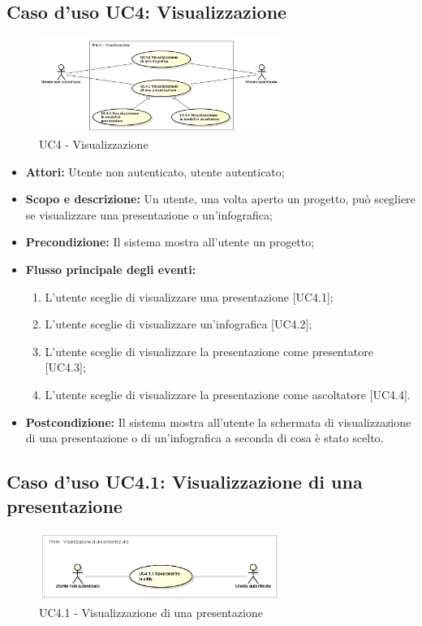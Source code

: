 \subsection{Caso d'uso UC4: Visualizzazione}
\begin{figure}[h] 
	\centering 
	\includegraphics[width=0.7\textwidth] {img/UC4.png}
	\caption{UC4 - Visualizzazione} 
\end{figure}

\begin{itemize}
	\item \textbf{Attori:} Utente non autenticato, utente autenticato;
	\item \textbf{Scopo e descrizione:} Un utente, una volta aperto un progetto, può scegliere se visualizzare una presentazione o un'\gls{infografica};
	\item \textbf{Precondizione:} Il sistema mostra all'utente un progetto;
	\item \textbf{Flusso principale degli eventi:}
	\begin{enumerate}
		\item L'utente sceglie di visualizzare una presentazione [UC4.1];
		\item L'utente sceglie di visualizzare un'\gls{infografica} [UC4.2];
		\item L'utente sceglie di visualizzare la presentazione come presentatore [UC4.3];
		\item L'utente sceglie di visualizzare la presentazione come ascoltatore [UC4.4].
	\end{enumerate}
	\item \textbf{Postcondizione:} Il sistema mostra all'utente la schermata di visualizzazione di una presentazione o di un'\gls{infografica} a seconda di cosa è stato scelto.
\end{itemize}

\subsection{Caso d'uso UC4.1: Visualizzazione di una presentazione}
\begin{figure}[h] 
	\centering 
	\includegraphics[width=0.7\textwidth] {img/UC4.1.png}
	\caption{UC4.1 - Visualizzazione di una presentazione} 
\end{figure}

